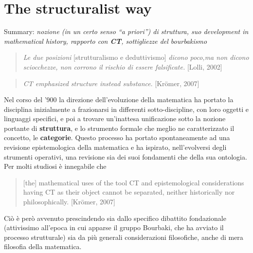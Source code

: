\documentclass[a4paper, 11pt]{article}
\begin{document}
\section{The structuralist way}
Summary: \textit{nozione (in un certo senso ``a priori'') di struttura, suo development in mathematical history, rapporto con \textbf{CT}, sottigliezze del bourbakismo}
\begin{quotation}
	\begin{flushright}
		\textit{Le due posizioni} [strutturalismo e deduttivismo] \textit{dicono poco,ma non dicono sciocchezze, non corrono il rischio di essere falsificate.} [Lolli, 2002]
	\end{flushright}
\end{quotation}
\begin{quotation}
	\begin{flushright}
		\textit{CT emphasized structure instead substance}. [Kr\"omer, 2007]
	\end{flushright}
\end{quotation}
Nel corso del '900 la direzione dell'evoluzione della matematica ha portato la disciplina inizialmente a frazionarsi in differenti sotto-discipline, con loro oggetti e linguaggi specifici, e poi a trovare un'inattesa unificazione sotto la nozione portante di \textbf{struttura}, e lo strumento formale che meglio ne caratterizzato il concetto, le \textbf{categorie}.
Questo processo ha portato spontaneamente ad una revisione epistemologica della matematica e ha ispirato, nell'evolversi degli strumenti operativi, una revisione sia dei suoi fondamenti che della sua ontologia. Per molti studiosi è innegabile che
\begin{quotation}
	[the] mathematical uses of the tool CT and epistemological
	considerations having CT as their object cannot be separated, neither historically
	nor philosophically. [Kr\"omer, 2007]
\end{quotation}
Ciò è però avvenuto prescindendo sia dallo specifico dibattito fondazionale (attivissimo all'epoca in cui apparse il gruppo Bourbaki, \endfo che ha avviato il processo strutturale) sia da più generali considerazioni filosofiche, anche di mera filosofia della matematica.
\end{document}
